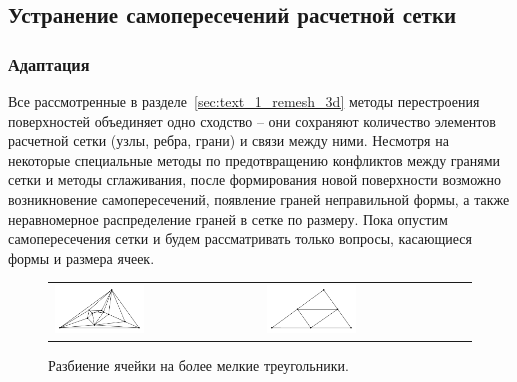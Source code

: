 \subsection{Устранение самопересечений расчетной сетки}

\subsubsection{Адаптация}

Все рассмотренные в разделе~\ref{sec:text_1_remesh_3d} методы перестроения поверхностей объединяет одно сходство -- они сохраняют количество элементов расчетной сетки (узлы, ребра, грани) и связи между ними.
Несмотря на некоторые специальные методы по предотвращению конфликтов между гранями сетки и методы сглаживания, после формирования новой поверхности возможно возникновение самопересечений, появление граней неправильной формы, а также неравномерное распределение граней в сетке по размеру.
Пока опустим самопересечения сетки и будем рассматривать только вопросы, касающиеся формы и размера ячеек.

\begin{figure}[h]
\centering
\begin{tabular}{ll}
\includegraphics[width=0.45\textwidth]{./pics/text_1_int/pic_delaunay.pdf}
&
\includegraphics[width=0.45\textwidth]{./pics/text_1_int/pic_delaunay_2.pdf}
\end{tabular}
\caption{Разбиение ячейки на более мелкие треугольники.}
\label{fig:text_1_int_cut}
\end{figure}


